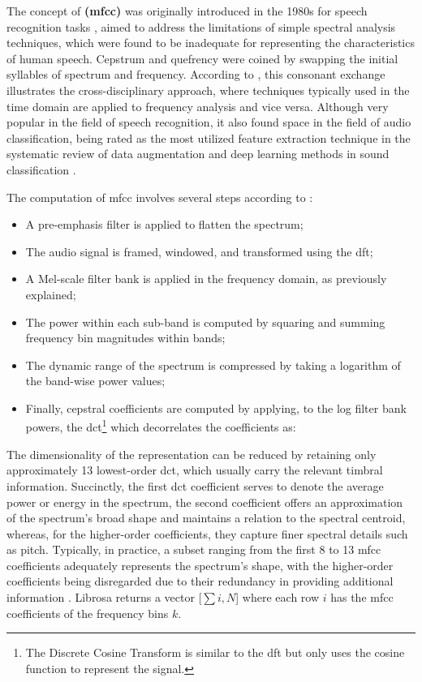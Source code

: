 The concept of \textbf{ (\gls{mfcc})} was originally introduced in the 1980s for speech recognition tasks \cite{DavisMermelstein1980}, aimed to address the limitations of simple spectral analysis techniques, which were found to be inadequate for representing the characteristics of human speech. Cepstrum and quefrency were coined by swapping the initial syllables of spectrum and frequency. According to \textcite{Oppenheim2004}, this consonant exchange illustrates the cross-disciplinary approach, where techniques typically used in the time domain are applied to frequency analysis and vice versa. Although very popular in the field of speech recognition, it also found space in the field of audio classification, being rated as the most utilized feature extraction technique in the systematic review of data augmentation and deep learning methods in sound classification \cite{Alli2022}.

The computation of \gls{mfcc} involves several steps according to \textcite{Klapuri2006}:

\begin{itemize}
    \item A pre-emphasis filter is applied to flatten the spectrum;
    \item The audio signal is framed, windowed, and transformed using the \gls{dft};
    \item A Mel-scale filter bank is applied in the frequency domain, as previously explained;
    \item The power within each sub-band is computed by squaring and summing frequency bin magnitudes within bands;
    \item The dynamic range of the spectrum is compressed by taking a logarithm of the band-wise power values;
    \item Finally, cepstral coefficients are computed by applying, to the log filter bank powers, the \gls{dct}\footnote{The Discrete Cosine Transform is similar to the \gls{dft} but only uses the cosine function to represent the signal.} which decorrelates the coefficients as:
\end{itemize}

The dimensionality of the representation can be reduced by retaining only approximately 13 lowest-order \gls{dct}, which usually carry the relevant timbral information. Succinctly, the first \gls{dct} coefficient serves to denote the average power or energy in the spectrum, the second coefficient offers an approximation of the spectrum's broad shape and maintains a relation to the spectral centroid, whereas, for the higher-order coefficients, they capture finer spectral details such as pitch. Typically, in practice, a subset ranging from the first 8 to 13 \gls{mfcc} coefficients adequately represents the spectrum's shape, with the higher-order coefficients being disregarded due to their redundancy in providing additional information \cite{Abreha2014}. Librosa returns a vector [$\sum i, N$] where each row $i$ has the \gls{mfcc} coefficients of the frequency bins $k$.

